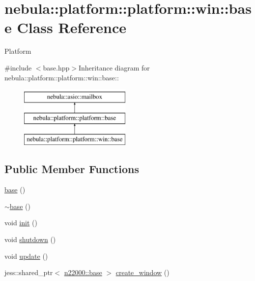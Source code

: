 \hypertarget{classnebula_1_1platform_1_1platform_1_1win_1_1base}{
\section{nebula::platform::platform::win::base Class Reference}
\label{classnebula_1_1platform_1_1platform_1_1win_1_1base}
}


Platform  


{\ttfamily \#include $<$base.hpp$>$}Inheritance diagram for nebula::platform::platform::win::base::\begin{figure}[H]
\begin{center}
\leavevmode
\includegraphics[height=3cm]{classnebula_1_1platform_1_1platform_1_1win_1_1base}
\end{center}
\end{figure}
\subsection*{Public Member Functions}
\begin{DoxyCompactItemize}
\item 
\hyperlink{classnebula_1_1platform_1_1platform_1_1win_1_1base_a80a1eae8a99db4680430cd473a4be9e7}{base} ()
\item 
\hyperlink{classnebula_1_1platform_1_1platform_1_1win_1_1base_ae3b97a8472033fe4b4067a783c440c18}{$\sim$base} ()
\item 
void \hyperlink{classnebula_1_1platform_1_1platform_1_1win_1_1base_a821e7025682331035b371c5aaa709cf4}{init} ()
\item 
void \hyperlink{classnebula_1_1platform_1_1platform_1_1win_1_1base_ab01580e3a7d8e146512d5a23fb5c9bb1}{shutdown} ()
\item 
void \hyperlink{classnebula_1_1platform_1_1platform_1_1win_1_1base_a89720e3bc6dee8af7f77469c8693596e}{update} ()
\item 
jess::shared\_\-ptr$<$ \hyperlink{classnebula_1_1platform_1_1window_1_1base}{n22000::base} $>$ \hyperlink{classnebula_1_1platform_1_1platform_1_1win_1_1base_a6789ffe77928a45dc3cbd6dea0fd2d4b}{create\_\-window} ()
\end{DoxyCompactItemize}


